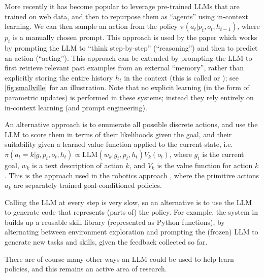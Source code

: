 More recently it has become popular to leverage
pre-trained LLMs that are trained on web data,
and then to repurpose them as ``agents'' using in-context learning.
We can then sample an action from the  policy $\pi(a_t|p_t,o_t,h_{t-1})$,
where $p_t$ is a  manually chosen prompt.
This approach is used by the  paper
\citep{react} which 
works by prompting the LLM to ``think step-by-step''
(``reasoning'') and then to predict an action (``acting'').
This approach can be extended by prompting the LLM to first
retrieve relevant past examples from an external ``memory'',
rather than explicitly storing the entire history $h_t$ in the context
(this is called 
or ); see \cref{fig:smallville} for an illustration.
Note that no explicit learning (in the form of parametric updates)
is performed in these systems; instead they rely entirely
on in-context learning (and prompt engineering).


An alternative approach is to enumerate all possible
discrete actions, and use the LLM to  score them in terms
of their likelihoods given the goal,
and their suitability given a learned value function
applied to the current state,
i.e.  $\pi(a_t=k|g,p_t,o_t,h_t) \propto \text{LLM}(w_k|g_t,p_t,h_t) V_k(o_t)$,
where $g_t$ is the current goal,
$w_k$ is a text description of  action $k$,
and $V_k$ is the value function for action $k$.
This is the approach used in the
robotics  approach \citep{Ichter2023},
where the primitive actions $a_k$ are  separately trained
goal-conditioned policies.

Calling the LLM at every step is very slow,
so an alternative is to use the LLM to generate
code that represents (parts of) the policy.
For example, the  system in
\citep{voyager} builds up a reusable skill library
(represented as Python functions),
by alternating between environment exploration
and prompting the (frozen) LLM to generate new tasks and skills,
given the feedback collected so far.

There are of course many other ways an LLM could be used to help
learn policies, and this remains an active area of research.



